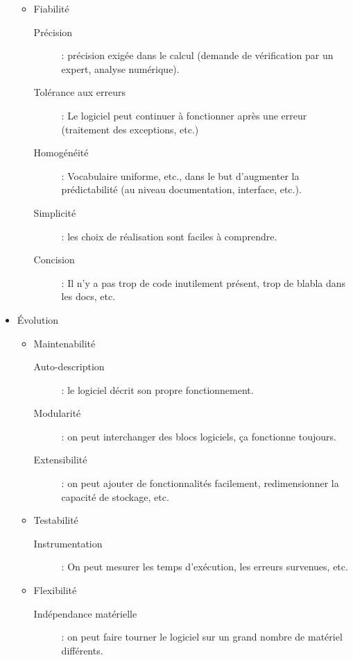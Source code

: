 \begin{itemize}
\begin{itemize}
	\item Fiabilité
		\begin{description}	
		\item[Précision] : précision exigée dans le calcul (demande de vérification par un expert, analyse numérique).
		\item[Tolérance aux erreurs] : Le logiciel peut continuer à fonctionner après une erreur (traitement des exceptions, etc.)
		\item[Homogénéité] : Vocabulaire uniforme, etc., dans le but d'augmenter la prédictabilité (au niveau documentation, interface, etc.).
		\item[Simplicité] : les choix de réalisation sont faciles à comprendre.
		\item[Concision] : Il n'y a pas trop de code inutilement présent, trop de blabla dans les docs, etc.
		\end{description}

	\end{itemize}

\item Évolution
	\begin{itemize}

	\item Maintenabilité
		\begin{description}			
		\item[Auto-description] : le logiciel décrit son propre fonctionnement.		
		\item[Modularité] : on peut interchanger des blocs logiciels, ça fonctionne toujours.
		\item[Extensibilité] : on peut ajouter de fonctionnalités facilement, redimensionner la capacité de stockage, etc.
		\end{description}

	\item Testabilité
		\begin{description}	
		\item[Instrumentation] : On peut mesurer les temps d'exécution, les erreurs survenues, etc.
		\end{description}

	\item Flexibilité
		\begin{description}	
		\item[Indépendance matérielle] : on peut faire tourner le logiciel sur un grand nombre de matériel différents.
		\end{description}

	\end{itemize}	


\end{itemize}
